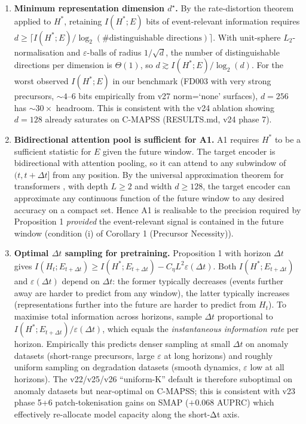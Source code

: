 \documentclass[11pt]{article}
\begin{document}
\begin{enumerate}[leftmargin=1.5em,label=(P\arabic*)]
\item \textbf{Minimum representation dimension $d^\star$.}
By the rate-distortion theorem applied to $H^*$, retaining $I(H^*;E)$
bits of event-relevant information requires $d\ge\lceil
I(H^*;E)/\log_2(\#\text{distinguishable directions})\rceil$. With unit-sphere
$L_2$-normalisation and $\varepsilon$-balls of radius $1/\sqrt d$, the
number of distinguishable directions per dimension is $\Theta(1)$, so
$d\gtrsim I(H^*;E)/\log_2(d)$. For the worst observed $I(H^*;E)$ in our
benchmark (FD003 with very strong precursors, $\sim 4$--$6$ bits empirically
from v27 norm=`none' surfaces), $d=256$ has $\sim 30\times$ headroom.
This is consistent with the v24 ablation showing $d=128$ already saturates
on C-MAPSS (RESULTS.md, v24 phase 7).

\item \textbf{Bidirectional attention pool is sufficient for A1.}
A1 requires $H^*$ to be a sufficient statistic for $E$ given the future
window. The target encoder is bidirectional with attention pooling, so it
can attend to any subwindow of $(t,t+\Delta t]$ from any position. By the
universal approximation theorem for transformers
\citep{yun2020universal}, with depth $L\ge 2$ and width $d\ge 128$, the
target encoder can approximate any continuous function of the future
window to any desired accuracy on a compact set. Hence A1 is realisable
to the precision required by Proposition 1 \emph{provided} the
event-relevant signal is contained in the future window
(condition (i) of Corollary 1 (Precursor Necessity)).

\item \textbf{Optimal $\Delta t$ sampling for pretraining.}
Proposition 1 with horizon $\Delta t$ gives $I(H_t;E_{t+\Delta t})\ge
I(H^*;E_{t+\Delta t})-C_\eta L^2\varepsilon(\Delta t)$. Both
$I(H^*;E_{t+\Delta t})$ and $\varepsilon(\Delta t)$ depend on $\Delta t$:
the former typically decreases (events further away are harder to
predict from any window), the latter typically increases (representations
further into the future are harder to predict from $H_t$). To maximise
total information across horizons, sample $\Delta t$ proportional to
$I(H^*;E_{t+\Delta t})/\varepsilon(\Delta t)$, which equals the
\emph{instantaneous information rate} per horizon. Empirically this
predicts denser sampling at small $\Delta t$ on anomaly datasets
(short-range precursors, large $\varepsilon$ at long horizons) and
roughly uniform sampling on degradation datasets (smooth dynamics,
$\varepsilon$ low at all horizons). The v22/v25/v26 ``uniform-K'' default
is therefore suboptimal on anomaly datasets but near-optimal on C-MAPSS;
this is consistent with v23 phase 5+6 patch-tokenisation gains on SMAP
($+0.068$ AUPRC) which effectively re-allocate model capacity along the
short-Δt axis.


\end{enumerate}
\end{document}
